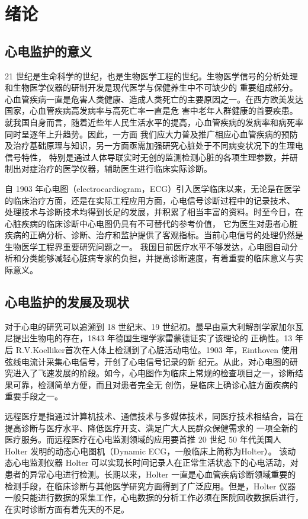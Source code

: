 \chapter{绪论}

\section{心电监护的意义}
21 世纪是生命科学的世纪，也是生物医学工程的世纪。生物医学信号的分析处理和生物医学仪器的研制开发是现代医学与保健养生中不可缺少的
重要组成部分。心血管疾病一直是危害人类健康、造成人类死亡的主要原因之一。在西方欧美发达国家，心血管疾病高发病率与高死亡率一直是危
害中老年人群健康的首要疾患。就我国自身而言，随着近些年人民生活水平的提高，心血管疾病的发病率和病死率同时呈逐年上升趋势。因此，一方面
我们应大力普及推广相应心血管疾病的预防及治疗基础原理与知识，另一方面亟需加强研究心脏处于不同病变状况下的生理电信号特性，
特别是通过人体导联实时无创的监测检测心脏的各项生理参数，并研制出对症治疗的医学仪器，辅助医生进行临床实际诊断。

自 1903 年心电图（electrocardiogram，ECG）引入医学临床以来，无论是在医学的临床治疗方面，还是在实际工程应用方面，心电信号诊断过程中的记录技术、
处理技术与诊断技术均得到长足的发展，并积累了相当丰富的资料。时至今日，在心脏疾病的临床诊断中心电图仍具有不可替代的参考价值，
它为医生对患者心脏疾病的正确分析、诊断、治疗和监护提供了客观指标。当前心电信号的处理仍然是生物医学工程界重要研究问题之一。
我国目前医疗水平不够发达，心电图自动分析和分类能够减轻心脏病专家的负担，并提高诊断速度，有着重要的临床意义与实际意义。

\section{心电监护的发展及现状}
对于心电的研究可以追溯到 18 世纪末、19 世纪初。最早由意大利解剖学家加尔瓦尼提出生物电的存在，1843 年德国生理学家雷蒙德证实了该理论的
正确性。13 年后 R.V.Koelliker首次在人体上检测到了心脏活动电位。1903 年，Einthoven 使用弦线电流计采集心电信号，开创了心电信号记录的新
纪元。从此，对心电图的研究进入了飞速发展的阶段。如今，心电图作为临床上常规的检查项目之一，诊断结果可靠，检测简单方便，而且对患者完全无
创伤，是临床上确诊心脏方面疾病的重要手段之一。

远程医疗是指通过计算机技术、通信技术与多媒体技术，同医疗技术相结合，旨在提高诊断与医疗水平、降低医疗开支、满足广大人民群众保健需求的
一项全新的医疗服务。而远程医疗在心电监测领域的应用要首推 20 世纪 50 年代美国人 Holter 发明的动态心电图机（Dynamic ECG，一般临床上简称为Holter）\cite{1}。
该动态心电监测仪器 Holter 可以实现长时间记录人在正常生活状态下的心电活动，对患者的异常心电进行检测。长期以来，Holter 一直是心血管疾病诊断领域重要的
检测手段，在临床诊断与其他医学研究方面得到了广泛应用。但是，Holter 仪器一般只能进行数据的采集工作，心电数据的分析工作必须在医院回收数据后进行，
在实时诊断方面有着先天的不足。

